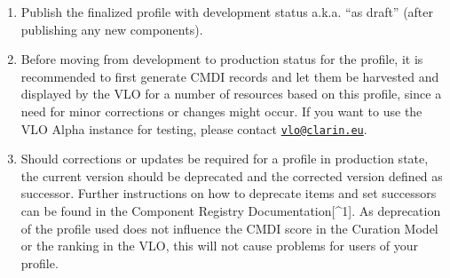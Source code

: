 \begin{enumerate}
\def\labelenumi{\arabic{enumi}.}
\setcounter{enumi}{4}
\tightlist
\item
  Publish the finalized profile with development status a.k.a. ``as
  draft'' (after publishing any new components).
\item
  Before moving from development to production status for the profile,
  it is recommended to first generate CMDI records and let them be
  harvested and displayed by the VLO for a number of resources based on
  this profile, since a need for minor corrections or changes might
  occur. If you want to use the VLO Alpha instance for testing, please
  contact \href{mailto:vlo@clarin.eu}{\nolinkurl{vlo@clarin.eu}}.
\item
  Should corrections or updates be required for a profile in production
  state, the current version should be deprecated and the corrected
  version defined as successor. Further instructions on how to deprecate
  items and set successors can be found in the Component Registry
  Documentation{[}\^{}1{]}. As deprecation of the profile used does not
  influence the CMDI score in the Curation Model or the ranking in the
  VLO, this will not cause problems for users of your profile.
\end{enumerate}
